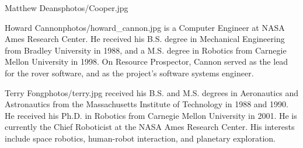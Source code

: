 \documentclass[twocolumn,letterpaper]{IEEEAerospaceCLS}  %
\begin{document}
\begin{biographywithpic}
{Matthew Deans}{photos/Cooper.jpg} 
\end{biographywithpic} 

\begin{biographywithpic}
{Howard Cannon}{photos/howard_cannon.jpg} is a Computer Engineer at NASA Ames Research Center. He received his B.S. degree in Mechanical Engineering from Bradley University in 1988, and a M.S. degree in Robotics from Carnegie Mellon University in 1998. On Resource Prospector, Cannon served as the lead for the rover software, and as the project's software systems engineer. 
\end{biographywithpic} 

\begin{biographywithpic}
{Terry Fong}{photos/terry.jpg} received his B.S. and M.S. degrees in Aeronautics and Astronautics from the Massachusetts Institute of Technology in 1988 and 1990. He received his Ph.D. in Robotics from Carnegie Mellon University in 2001. He is currently the Chief Roboticist at the NASA Ames Research Center. His interests include space robotics, human-robot interaction, and planetary exploration. 
\end{biographywithpic} 
\end{document}

